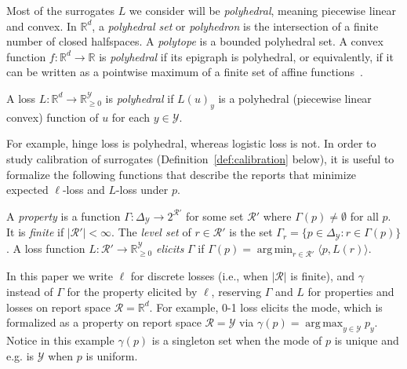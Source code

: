 \documentclass[final]{colt2020} %
\newcommand{\reals}{\mathbb{R}}
\newcommand{\nonnegreals}{\reals_{\geq 0}}%
\newcommand{\simplex}{\Delta_\Y}
\newcommand{\R}{\mathcal{R}}
\newcommand{\Y}{\mathcal{Y}}
\newcommand{\inprod}[2]{\langle #1, #2 \rangle}%
\DeclareMathOperator*{\argmax}{arg\,max}
\DeclareMathOperator*{\argmin}{arg\,min}
\begin{document}
Most of the surrogates $L$ we consider will be \emph{polyhedral}, meaning piecewise linear and convex.
In $\reals^d$, a \emph{polyhedral set} or \emph{polyhedron} is the intersection of a finite number of closed halfspaces.
A \emph{polytope} is a bounded polyhedral set.
A convex function $f:\reals^d\to\reals$ is \emph{polyhedral} if its epigraph is polyhedral, or equivalently, if it can be written as a pointwise maximum of a finite set of affine functions~\citep{rockafellar1997convex}.
%
\begin{definition}
	A loss $L: \reals^d \to \nonnegreals^{\Y}$ is \emph{polyhedral} if $L(u)_y$ is a polyhedral (piecewise linear convex) function of $u$ for each $y\in\Y$.
\end{definition}
%
For example, hinge loss is polyhedral, whereas logistic loss is not.
In order to study calibration of surrogates (Definition~\ref{def:calibration} below), it is useful to formalize the following functions that describe the reports that minimize expected $\ell$-loss and $L$-loss under $p$.
\begin{definition}
  A \emph{property} is a function $\Gamma: \simplex \to 2^{\R'}$ for some set $\R'$ where $\Gamma(p) \neq \emptyset$ for all $p$.
  It is \emph{finite} if $|\R'| < \infty$.
  The \emph{level set} of $r \in \R'$ is the set $\Gamma_r = \{p \in \simplex : r \in \Gamma(p)\}$.
  A loss function $L: \R' \to \nonnegreals^{\Y}$ \emph{elicits} $\Gamma$ if $\Gamma(p) = \argmin_{r \in \R'} \inprod{p}{L(r)}$.
\end{definition}
In this paper we write $\ell$ for discrete losses (i.e., when $|\R|$ is finite), and $\gamma$ instead of $\Gamma$ for the property elicited by $\ell$, reserving $\Gamma$ and $L$ for properties and losses on report space $\R=\reals^d$.
For example, 0-1 loss elicits the mode, which is formalized as a property on report space $\R = \Y$ via $\gamma(p) = \argmax_{y \in \Y} p_y$.
Notice in this example $\gamma(p)$ is a singleton set when the mode of $p$ is unique and e.g. is $\Y$ when $p$ is uniform.
\end{document}
